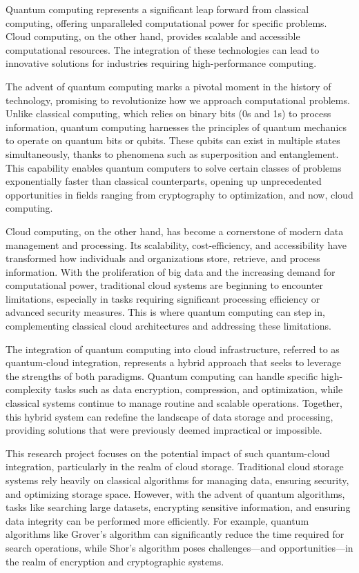\documentclass[12pt,a4paper]{article}
\begin{document}
Quantum computing represents a significant leap forward from classical computing, offering unparalleled computational power for specific problems. Cloud computing, on the other hand, provides scalable and accessible computational resources. The integration of these technologies can lead to innovative solutions for industries requiring high-performance computing.

The advent of quantum computing marks a pivotal moment in the history of technology, promising to revolutionize how we approach computational problems. Unlike classical computing, which relies on binary bits (0s and 1s) to process information, quantum computing harnesses the principles of quantum mechanics to operate on quantum bits or qubits. These qubits can exist in multiple states simultaneously, thanks to phenomena such as superposition and entanglement. This capability enables quantum computers to solve certain classes of problems exponentially faster than classical counterparts, opening up unprecedented opportunities in fields ranging from cryptography to optimization, and now, cloud computing.  

Cloud computing, on the other hand, has become a cornerstone of modern data management and processing. Its scalability, cost-efficiency, and accessibility have transformed how individuals and organizations store, retrieve, and process information. With the proliferation of big data and the increasing demand for computational power, traditional cloud systems are beginning to encounter limitations, especially in tasks requiring significant processing efficiency or advanced security measures. This is where quantum computing can step in, complementing classical cloud architectures and addressing these limitations.  

The integration of quantum computing into cloud infrastructure, referred to as quantum-cloud integration, represents a hybrid approach that seeks to leverage the strengths of both paradigms. Quantum computing can handle specific high-complexity tasks such as data encryption, compression, and optimization, while classical systems continue to manage routine and scalable operations. Together, this hybrid system can redefine the landscape of data storage and processing, providing solutions that were previously deemed impractical or impossible.  

This research project focuses on the potential impact of such quantum-cloud integration, particularly in the realm of cloud storage. Traditional cloud storage systems rely heavily on classical algorithms for managing data, ensuring security, and optimizing storage space. However, with the advent of quantum algorithms, tasks like searching large datasets, encrypting sensitive information, and ensuring data integrity can be performed more efficiently. For example, quantum algorithms like Grover’s algorithm can significantly reduce the time required for search operations, while Shor’s algorithm poses challenges—and opportunities—in the realm of encryption and cryptographic systems.  
\end{document}
